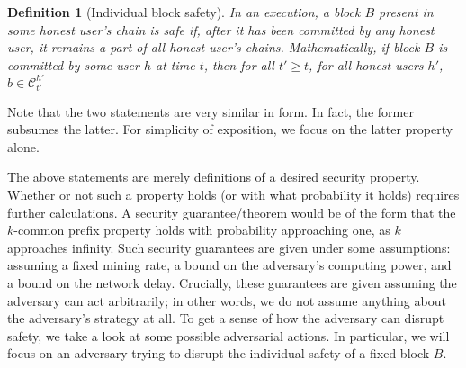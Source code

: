 \documentclass{article}
\newtheorem{definition}{Definition}
\begin{document}
\begin{definition}[Individual block safety]
In an execution, a block $B$ present in some honest user's chain is safe if, after it has been committed by any honest user, it remains a part of all honest user's chains. Mathematically, if block $B$ is committed by some user $h$ at time $t$, then for all $t' \geq t$, for all honest users $h'$, $b \in \mathcal{C}^{h'}_{t'}$
\end{definition}

Note that the two statements are very similar in form. In fact, the former subsumes the latter. For simplicity of exposition, we focus on the latter property alone.

The above statements are merely definitions of a desired security property. Whether or not such a property holds (or with what probability it holds) requires further calculations. A security guarantee/theorem would be of the form that the $k$-common prefix property holds with  probability approaching one, as $k$ approaches infinity.  Such security guarantees are given under some assumptions: assuming a fixed mining rate, a bound on the adversary's computing power, and a bound on the network delay. Crucially, these guarantees are given assuming the adversary can act arbitrarily; in other words, we do not assume anything about the adversary's strategy at all. To get a sense of how the adversary can disrupt safety, we take a look at some possible adversarial actions. In particular, we will focus on an adversary trying to disrupt the individual safety of a fixed block $B$.





\end{document}
